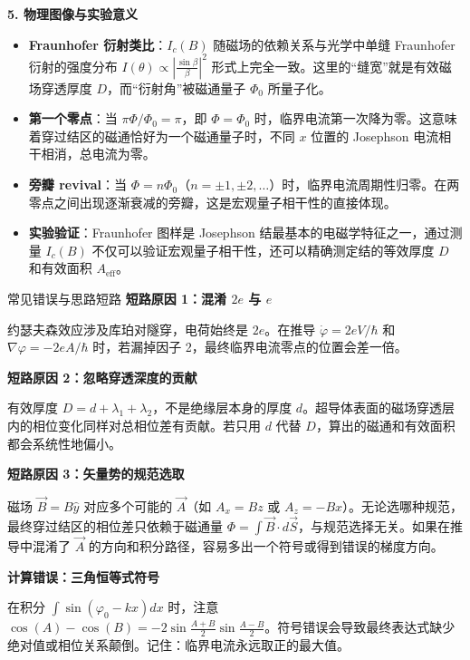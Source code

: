 \textbf{5. 物理图像与实验意义}

\begin{itemize}[nosep]
    \item \textbf{Fraunhofer 衍射类比}：$I_c(B)$ 随磁场的依赖关系与光学中单缝 Fraunhofer 衍射的强度分布 $I(\theta) \propto \left| \frac{\sin\beta}{\beta} \right|^2$ 形式上完全一致。这里的``缝宽''就是有效磁场穿透厚度 $D$，而``衍射角''被磁通量子 $\Phi_0$ 所量子化。
    \item \textbf{第一个零点}：当 $\pi\Phi/\Phi_0 = \pi$，即 $\Phi = \Phi_0$ 时，临界电流第一次降为零。这意味着穿过结区的磁通恰好为一个磁通量子时，不同 $x$ 位置的 Josephson 电流相干相消，总电流为零。
    \item \textbf{旁瓣 revival}：当 $\Phi = n\Phi_0$（$n=\pm 1, \pm 2, \dots$）时，临界电流周期性归零。在两零点之间出现逐渐衰减的旁瓣，这是宏观量子相干性的直接体现。
    \item \textbf{实验验证}：Fraunhofer 图样是 Josephson 结最基本的电磁学特征之一，通过测量 $I_c(B)$ 不仅可以验证宏观量子相干性，还可以精确测定结的等效厚度 $D$ 和有效面积 $A_{\text{eff}}$。
\end{itemize}

\begin{errorbox}[colback=white]{常见错误与思路短路}
\textbf{短路原因 1：混淆 $2e$ 与 $e$}

约瑟夫森效应涉及库珀对隧穿，电荷始终是 $2e$。在推导 $\dot\varphi = 2eV/\hbar$ 和 $\nabla\varphi = -2eA/\hbar$ 时，若漏掉因子 2，最终临界电流零点的位置会差一倍。

\textbf{短路原因 2：忽略穿透深度的贡献}

有效厚度 $D = d + \lambda_1 + \lambda_2$，不是绝缘层本身的厚度 $d$。超导体表面的磁场穿透层内的相位变化同样对总相位差有贡献。若只用 $d$ 代替 $D$，算出的磁通和有效面积都会系统性地偏小。

\textbf{短路原因 3：矢量势的规范选取}

磁场 $\vec{B}=B\hat{y}$ 对应多个可能的 $\vec{A}$（如 $A_x = Bz$ 或 $A_z = -Bx$）。无论选哪种规范，最终穿过结区的相位差只依赖于磁通量 $\Phi = \int \vec{B}\cdot d\vec{S}$，与规范选择无关。如果在推导中混淆了 $\vec{A}$ 的方向和积分路径，容易多出一个符号或得到错误的梯度方向。

\textbf{计算错误：三角恒等式符号}

在积分 $\int \sin(\varphi_0 - kx)dx$ 时，注意 $\cos(A)-\cos(B) = -2\sin\frac{A+B}{2}\sin\frac{A-B}{2}$。符号错误会导致最终表达式缺少绝对值或相位关系颠倒。记住：临界电流永远取正的最大值。
\end{errorbox}

